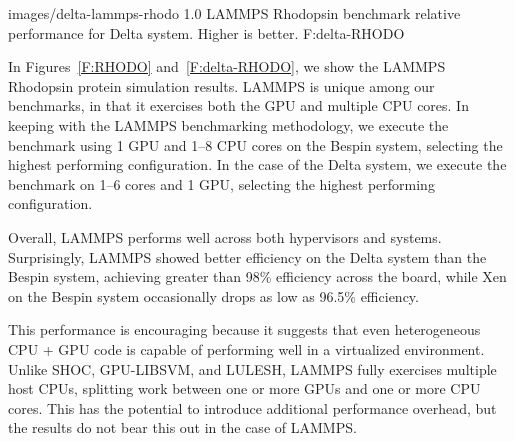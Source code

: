   {images/delta-lammps-rhodo}
  {1.0}
  {LAMMPS Rhodopsin benchmark relative performance for Delta system.  Higher is better.}
  {F:delta-RHODO} 





In Figures~\ref{F:RHODO} and~\ref{F:delta-RHODO}, we show the LAMMPS Rhodopsin protein simulation results.
LAMMPS is unique among our benchmarks, in that it exercises both the GPU and
multiple CPU cores.  In keeping with the LAMMPS benchmarking methodology, we
execute the benchmark using 1 GPU and 1--8 CPU cores
on the Bespin system,
selecting the highest performing configuration.  In the case of the Delta
system, we execute the benchmark on 1--6 cores and 1 GPU, selecting the highest
performing configuration.

Overall, LAMMPS performs well across both hypervisors and systems.
Surprisingly, LAMMPS showed better efficiency on the Delta system than the
Bespin system, achieving greater than 98\% efficiency across the board, while
Xen on the Bespin system occasionally drops as low as 96.5\% efficiency. 

This performance is encouraging because it suggests that even heterogeneous CPU
+ GPU code is capable of performing well in a virtualized environment.  Unlike
SHOC, GPU-LIBSVM, and LULESH, LAMMPS fully exercises multiple host CPUs,
splitting work between one or more GPUs and one or more CPU cores.  This has the
potential to introduce additional performance overhead, but the results do not
bear this out in the case of LAMMPS.  



